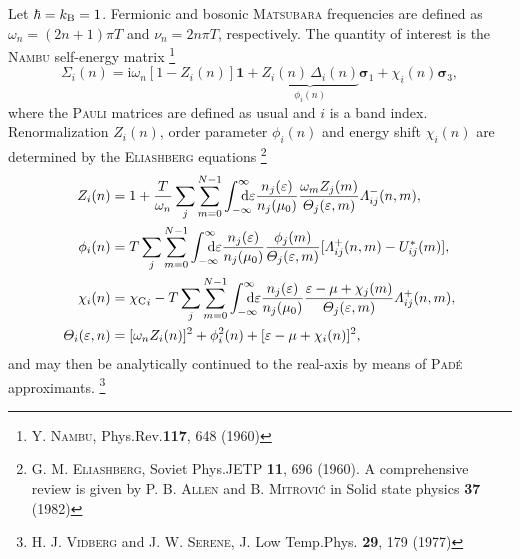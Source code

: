 \documentclass[a4paper]{article}
\def\D{\mathrm d}
\def\I{\mathrm i}
\def\sub#1{\sb{\mathrm{#1}}}
\def\from#1{\sb{\mathrlap{#1}}}
\def\till#1{\sp{\mathrlap{#1}}}
\let\vec\boldsymbol
\let\Delta\varDelta
\let\epsilon\varepsilon
\let\Lambda\varLambda
\let\Sigma\varSigma
\let\Theta\varTheta
\begin{document}
   Let $\hbar = k \sub B = 1$. Fermionic and bosonic \textsc{Matsubara}
   frequencies are defined as $\omega_n = (2 n + 1) \pi T$ and $\nu_n = 2 n \pi
   T$, respectively. The quantity of interest is the \textsc{Nambu} self-energy
   matrix%
   \footnote{Y. \textsc{Nambu}, Phys.\@ Rev.\@ \textbf{117}, 648 (1960)}
   \begin{equation*}
      \vec \Sigma_i(n)
      = \I \omega_n [1 - Z_i(n)] \vec 1
      + \underbrace{Z_i(n) \, \Delta_i(n)}
      _ {\displaystyle \phi_i(n)} \vec \sigma_1
      + \chi_i(n) \vec \sigma_3,
   \end{equation*}
   where the \textsc{Pauli} matrices are defined as usual and $i$ is a band
   index. Renormalization $Z_i(n)$, order parameter $\phi_i(n)$ and energy shift
   $\chi_i(n)$ are determined by the \textsc{Eliashberg} equations%
   \footnote{%
      G. M. \textsc{Eliashberg}, Soviet Phys.\@ JETP \textbf{11}, 696 (1960).
      \newline
      A comprehensive review is given by P. B. \textsc{Allen} and B.
      \textsc{Mitrović} in Solid state physics \textbf{37} (1982)
      }
   \begin{equation}
      \begin{split}
         Z_i(n) &= 1 + \frac T {\omega_n} \sum_j \sum_{m = 0}^{N - 1}
         \int \from{-\infty} \till \infty \D \epsilon
         \frac{n_j(\epsilon)}{n_j(\mu_0)}
         \frac{\omega_m Z_j (m)}{\Theta_j(\epsilon, m)}
         \Lambda_{i j}^-(n, m),
         \\
         \phi_i(n) &= T \sum_j \sum_{m = 0}^{N - 1}
         \int \from{-\infty} \till \infty \D \epsilon
         \frac{n_j(\epsilon)}{n_j(\mu_0)}
         \frac{\phi_j(m)}{\Theta_j(\epsilon, m)}
         [\Lambda_{i j}^+(n, m) - U^*_{i j}(m)],
         \\
         \chi_i(n) &= {\chi \sub C}_i - T \sum_j \sum_{m = 0}^{N - 1}
         \int \from{-\infty} \till \infty \D \epsilon
         \frac{n_j(\epsilon)}{n_j(\mu_0)}
         \frac{\epsilon - \mu + \chi_j(m)}{\Theta_j(\epsilon, m)}
         \Lambda_{i j}^+(n, m),
         \\
         \Theta_i(\epsilon, n) &=
         [\omega_n Z_i(n)]^2 + \phi_i^2(n) + [\epsilon - \mu + \chi_i(n)]^2,
      \end{split}
      \label{Eliashberg equations}
   \end{equation}
   and may then be analytically continued to the real-axis by means of
   \textsc{Padé} approximants.%
   \footnote{%
      H. J. \textsc{Vidberg} and J. W. \textsc{Serene}, J. Low Temp.\@ Phys.\@
      \textbf{29}, 179 (1977)
      }
\end{document}
